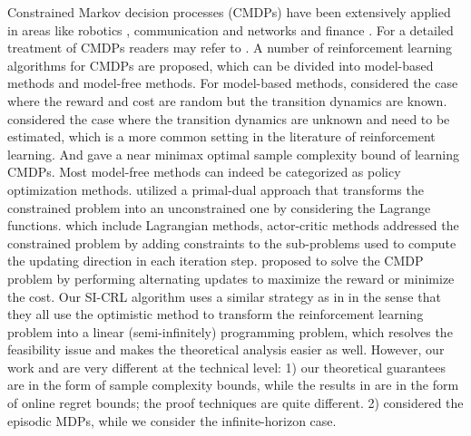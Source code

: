 Constrained Markov decision processes (CMDPs) have been extensively applied in areas like robotics \citep{ono2015chance}, communication and networks \citep{mastronarde2011fast, singh2018throughput} and finance \citep{abe2010optimizing}.
For a detailed treatment of CMDPs readers may refer to \cite{altman1999constrained}.
A number of reinforcement learning algorithms for CMDPs are proposed, which can be divided into model-based methods and model-free methods.
For model-based methods, \citet{wachi2020safe, zheng2020constrained} considered the case where the reward and cost are random but the transition dynamics are known.
\citet{efroni2020explorationexploitation, amani2021safe, ijcai2021-347} considered the case where the transition dynamics are unknown and need to be estimated, which is a more common setting in the literature of reinforcement learning.
And \citet{vaswani2022near} gave a near minimax optimal sample complexity bound of learning CMDPs.
Most model-free methods can indeed be categorized as policy optimization methods.
\citet{tessler2018reward, ding2020natural} utilized a primal-dual approach that transforms the constrained problem into an unconstrained one by considering the Lagrange functions.
which include Lagrangian methods, actor-critic methods \citet{achiam2017constrained, yang2020projection, liu2020ipo} addressed the constrained problem by adding constraints to the sub-problems used to compute the updating direction in each iteration step.
\citet{xu2021crpo} proposed to solve the CMDP problem by performing alternating updates to maximize the reward or minimize the cost.
Our SI-CRL algorithm uses a similar strategy as in \cite{efroni2020explorationexploitation} in the sense that they all use the optimistic method to transform the reinforcement learning problem into a linear (semi-infinitely) programming problem, which resolves the feasibility issue and makes the theoretical analysis easier as well.
However, our work and \cite{efroni2020explorationexploitation} are very different at the technical level: 1) our theoretical guarantees
are in the form of sample complexity bounds, while the results in \citep{efroni2020explorationexploitation}
are in the form of online regret bounds; the proof techniques are quite different. 2) \citet{efroni2020explorationexploitation} considered the episodic MDPs, while we consider the infinite-horizon case.


